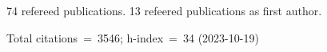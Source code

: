 74 refereed publications. 13 refeered publications as first author.

Total citations~=~3546; h-index~=~34 (2023-10-19)